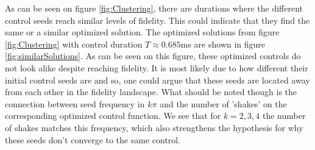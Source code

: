 \documentclass[a4paper, twocolumn]{revtex4-1}
\begin{document}
As can be seen on figure \ref{fig:Clustering}, there are durations where the different control seeds reach similar levels of fidelity. This could indicate that they find the same or a similar optimized solution. The optimized solutions from figure \ref{fig:Clustering} with control duration $T\approx 0.685$ms are shown in figure \ref{fig:similarSolutions}. As can be seen on this figure, these optimized controls do not look alike despite reaching fidelity. It is most likely due to how different their initial control seeds are and so, one could argue that these seeds are located away from each other in the fidelity landscape. What should be noted though is the connection between seed frequency in $k\pi$ and the number of 'shakes' on the corresponding optimized control function. We see that for $k=2,3,4$ the number of shakes matches this frequency, which also strengthens the hypothesis for why these seeds don't converge to the same control. \\
\end{document}
